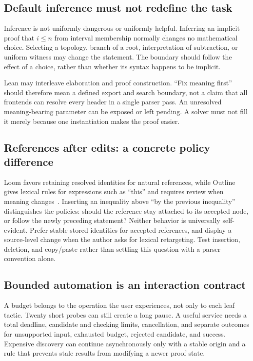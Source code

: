 \documentclass[11pt,letterpaper]{article}
\begin{document}
\subsection{Default inference must not redefine the task}
Inference is not uniformly dangerous or uniformly helpful. Inferring an implicit
proof that \(i\leq n\) from interval membership normally changes no mathematical
choice. Selecting a topology, branch of a root, interpretation of subtraction,
or uniform witness may change the statement. The boundary should follow the
effect of a choice, rather than whether its syntax happens to be implicit.

Lean may interleave elaboration and proof construction. ``Fix meaning first''
should therefore mean a defined export and search boundary, not a claim that all
frontends can resolve every header in a single parser pass. An unresolved
meaning-bearing parameter can be exposed or left pending. A solver must not fill
it merely because one instantiation makes the proof easier.

\subsection{References after edits: a concrete policy difference}
Loom favors retaining resolved identities for natural references, while Outline
gives lexical rules for expressions such as ``this'' and requires review when
meaning changes~\cite[\S3]{loom}\cite[\S5]{outline}. Inserting an inequality above
``by the previous inequality'' distinguishes the policies: should the reference
stay attached to its accepted node, or follow the newly preceding statement?
Neither behavior is universally self-evident. Prefer stable stored identities
for accepted references, and display a source-level change when the author asks
for lexical retargeting. Test insertion, deletion, and copy/paste rather than
settling this question with a parser convention alone.

\subsection{Bounded automation is an interaction contract}
A budget belongs to the operation the user experiences, not only to each leaf
tactic. Twenty short probes can still create a long pause. A useful service needs
a total deadline, candidate and checking limits, cancellation, and separate
outcomes for unsupported input, exhausted budget, rejected candidate, and success.
Expensive discovery can continue asynchronously only with a stable origin and a
rule that prevents stale results from modifying a newer proof state.
\end{document}
